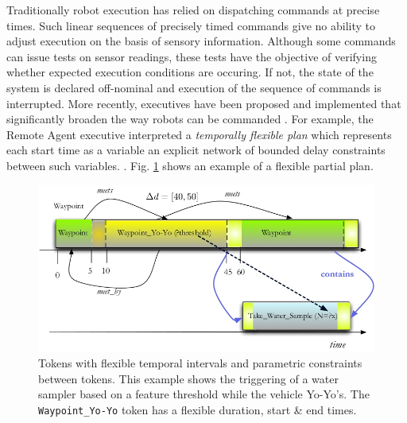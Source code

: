 Traditionally robot execution has relied on dispatching commands at
precise times. Such linear sequences of precisely timed commands give
no ability to adjust execution on the basis of sensory
information. Although some commands can issue tests on sensor
readings, these tests have the objective of verifying whether expected
execution conditions are occuring. If not, the state of the system is
declared off-nominal and execution of the sequence of commands is
interrupted. More recently, executives have been proposed and
implemented that significantly broaden the way robots can be commanded
\cite{mus98,alami:1998p820}. For example, the Remote Agent executive
interpreted a \textit{temporally flexible plan} which represents each
start time as a  variable
 an explicit network of bounded delay constraints
between such variables. . Fig. \ref{fig:flex-timelines}
shows an example of a flexible partial plan.

\begin{figure}[!htb]
\centering
\includegraphics[scale=2.3]{figs/flexible-timelines.jpeg}
\caption{\small Tokens with flexible temporal intervals and parametric
  constraints between tokens. This example shows the triggering of a
  water sampler based on a feature threshold while the vehicle
  Yo-Yo's. The \texttt{Waypoint\_Yo-Yo} token has a flexible duration,
  start \& end times.}
\label{fig:flex-timelines}
\end{figure}

